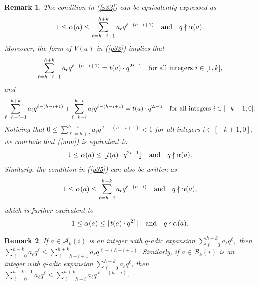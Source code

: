 \documentclass[journal,onecolumn]{IEEEtran}
\newtheorem{Remark}{Remark}
\begin{document}
\begin{Remark}\label{rm4}
 The  condition  in    (\ref{p32}) can be equivalently expressed as  \begin{equation}\label{mm}
    1\leq \alpha(a)\leq \sum\limits_{\ell=h-i+1}^{h+k}a_{\ell}q^{\ell-(h-i+1)}\quad \hbox{and}\quad q\nmid \alpha(a).
 \end{equation}
Moreover,  the form of $V(a)$ in (\ref{p33}) implies that 
\begin{equation}\notag
    \sum\limits_{\ell=h-i+1}^{h+k}a_{\ell}q^{\ell-(h-i+1)}=t(a)\cdot q^{2i-1} \quad \hbox{for all integers } i\in [1,k],
\end{equation} 
and 
\begin{equation}\notag
\sum\limits_{\ell=h-i+1}^{h+k}a_{\ell}q^{\ell-(h-i+1)} \nonumber +   \sum\limits_{\ell=h+i}^{h-i}a_{\ell}q^{\ell-(h-i+1)} 
  = t(a)\cdot q^{2i-1}\quad \hbox{for all integers }i\in [-k+1,0]. 
\end{equation} 
Noticing that  $0\leq \sum\limits_{\ell=h+i}^{h-i}a_{\ell}q^{\ell-(h-i+1)}<1$ for all integers $i\in [-k+1,0]$,  we  conclude that  (\ref{mm}) is equivalent to  
\begin{equation}\notag
   1\leq \alpha(a)\leq    \lfloor t(a)
   \cdot q^{2i-1}\rfloor \quad \hbox{and}\quad q\nmid \alpha(a).
\end{equation}
Similarly, 
the condition in  (\ref{p35}) can also   be written as  
 \begin{equation}\notag
 1\leq \alpha(a)\leq \sum\limits_{\ell=h-i}^{h+k}a_{\ell}q^{\ell-(h-i)} \quad\hbox{and}\quad q\nmid \alpha(a),\end{equation} which is further equivalent to 
 \begin{equation}\notag
 1\leq \alpha(a)\leq \lfloor t(a)\cdot q^{2i}\rfloor \quad\hbox{and}\quad q\nmid \alpha(a).
 \end{equation}
\end{Remark}




\begin{Remark}\label{rm6}
If   $a\in \mathcal{A}_k(i)$ is an integer with  $q$-adic expansion $\sum\limits_{\ell=0}^{h+k}a_{\ell}q^{\ell},$ then 
$\sum\limits_{\ell=0}^{h-k}a_{\ell}q^{\ell}\leq \sum\limits_{\ell=h-i+1}^{h+k}a_{\ell}q^{\ell-(h-i+1)}$.
Similarly,  if $a\in \mathcal{B}_k(i)$ is an integer with  $q$-adic expansion $\sum\limits_{\ell=0}^{h+k}a_{\ell}q^{\ell}$,  then   
$\sum\limits_{\ell=0}^{h-k-1}a_{\ell}q^{\ell}\leq \sum\limits_{\ell=h-i}^{h+k}a_{\ell}q^{\ell-(h-i)}$. 
\end{Remark}
\end{document}
